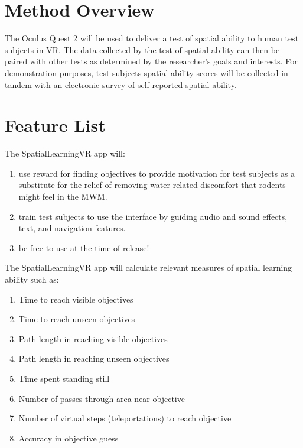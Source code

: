 \documentclass{report}
\begin{document}
\section*{Method Overview}
The Oculus Quest 2 will be used to deliver a test of spatial ability to human test subjects in VR. The data collected by the test of spatial ability can then be paired with other tests as determined by the researcher's goals and interests. For demonstration purposes, test subjects spatial ability scores will be collected in tandem with an electronic survey of self-reported spatial ability.

\section*{Feature List}

The SpatialLearningVR app will:
\begin{enumerate}
  \item use reward for finding objectives to provide motivation for test subjects as a substitute for the relief of removing water-related discomfort that rodents might feel in the MWM.
  \item train test subjects to use the interface by guiding audio and sound effects, text, and navigation features.
  \item be free to use at the time of release!
\end{enumerate}

The SpatialLearningVR app will calculate relevant measures of spatial learning ability such as:
\begin{enumerate}
  \item Time to reach visible objectives
  \item Time to reach unseen objectives
  \item Path length in reaching visible objectives
  \item Path length in reaching unseen objectives
  \item Time spent standing still
  \item Number of passes through area near objective
  \item Number of virtual steps (teleportations) to reach objective
  \item Accuracy in objective guess
\end{enumerate}
\end{document}
